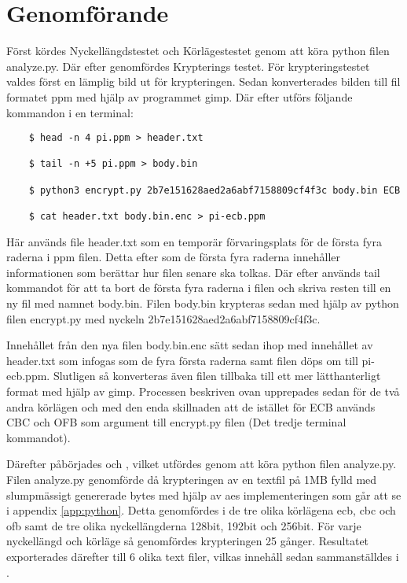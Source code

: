 \section{Genomförande} %
Först kördes Nyckellängdstestet och Körlägestestet genom att köra \gls{python} filen analyze.py. Där efter
genomfördes Krypterings testet. För krypteringstestet valdes först en lämplig bild ut för krypteringen. Sedan
konverterades bilden till fil formatet \gls{ppm} med hjälp av programmet \gls{gimp}. Där efter utförs följande kommandon i en terminal:

\begin{verbatim}
    $ head -n 4 pi.ppm > header.txt

    $ tail -n +5 pi.ppm > body.bin

    $ python3 encrypt.py 2b7e151628aed2a6abf7158809cf4f3c body.bin ECB

    $ cat header.txt body.bin.enc > pi-ecb.ppm
\end{verbatim}

Här används file header.txt som en temporär förvaringsplats för de första fyra raderna i \gls{ppm} filen. Detta
efter som de första fyra raderna innehåller informationen som berättar hur filen senare ska tolkas. Där efter används
tail kommandot för att ta bort de första fyra raderna i filen och skriva resten till en ny fil med namnet body.bin.
Filen body.bin krypteras sedan med hjälp av \gls{python} filen encrypt.py med nyckeln 2b7e151628aed2a6abf7158809cf4f3c.

Innehållet från den nya filen body.bin.enc sätt sedan ihop med innehållet av header.txt som infogas som de fyra första raderna samt filen döps om till pi-ecb.ppm.
Slutligen så konverteras även filen tillbaka till ett mer lätthanterligt format med hjälp av \gls{gimp}.
Processen beskriven ovan upprepades sedan för de två andra körlägen  och  med
den enda skillnaden att de istället för ECB används CBC och OFB som argument till encrypt.py filen (Det tredje terminal kommandot).

Därefter påbörjades  och , vilket utfördes genom att köra
\gls{python} filen analyze.py. Filen analyze.py genomförde då krypteringen av en textfil på 1MB fylld med slumpmässigt genererade \gls{byte}s med hjälp av \acrshort{aes}
implementeringen som går att se i appendix \ref{app:python}. Detta genomfördes i de tre olika körlägena \acrshort{ecb}, \acrshort{cbc} och \acrshort{ofb} samt de tre olika nyckellängderna 128bit, 192bit och 256bit.
För varje nyckellängd och körläge så genomfördes krypteringen 25 gånger. Resultatet exporterades därefter till 6 olika text filer, vilkas innehåll sedan sammanställdes i .